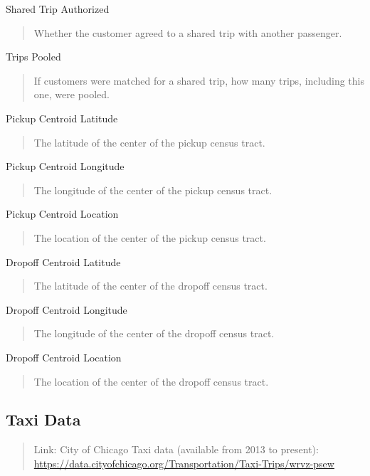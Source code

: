 \documentclass[]{article}
\begin{document}
Shared Trip Authorized

\begin{quote}
Whether the customer agreed to a shared trip with another passenger.
\end{quote}

Trips Pooled

\begin{quote}
If customers were matched for a shared trip, how many trips, including
this one, were pooled.
\end{quote}

Pickup Centroid Latitude

\begin{quote}
The latitude of the center of the pickup census tract.
\end{quote}

Pickup Centroid Longitude

\begin{quote}
The longitude of the center of the pickup census tract.
\end{quote}

Pickup Centroid Location

\begin{quote}
The location of the center of the pickup census tract.
\end{quote}

Dropoff Centroid Latitude

\begin{quote}
The latitude of the center of the dropoff census tract.
\end{quote}

Dropoff Centroid Longitude

\begin{quote}
The longitude of the center of the dropoff census tract.
\end{quote}

Dropoff Centroid Location

\begin{quote}
The location of the center of the dropoff census tract.
\end{quote}

\hypertarget{taxi-data}{%
\subsection{Taxi Data}\label{taxi-data}}

\begin{quote}
Link: City of Chicago Taxi data (available from 2013 to present):
\url{https://data.cityofchicago.org/Transportation/Taxi-Trips/wrvz-psew}
\end{quote}
\end{document}
